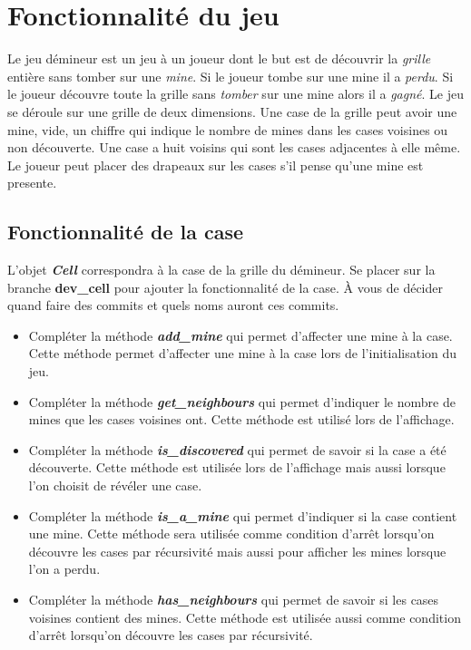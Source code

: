 \section{Fonctionnalité du jeu}
Le jeu démineur est un jeu à un joueur dont le but est de découvrir la \textit{grille} entière sans tomber sur une \textit{mine}. Si le joueur tombe sur une mine il a \textit{perdu}. Si le joueur découvre toute la grille sans \textit{tomber} sur une mine alors il a \textit{gagné}. Le jeu se déroule sur une grille de deux dimensions. Une case de la grille peut avoir une mine, vide, un chiffre qui indique le nombre de mines dans les cases voisines ou non découverte. Une case a huit voisins qui sont les cases adjacentes à elle même. Le joueur peut placer des drapeaux sur les cases s'il pense qu'une mine est presente.

\subsection{Fonctionnalité de la case}
L'objet \textit{\textbf{Cell}} correspondra à la case de la grille du démineur. Se placer sur la branche \textbf{dev\_cell} pour ajouter la fonctionnalité de la case. À vous de décider quand faire des commits et quels noms auront ces commits.

\medskip

\begin{itemize}
    \item Compléter la méthode \textit{\textbf{add\_mine}} qui permet d'affecter une mine à la case. Cette méthode permet d'affecter une mine à la case lors de l'initialisation du jeu.
    \medskip
    \item Compléter la méthode \textit{\textbf{get\_neighbours}} qui permet d'indiquer le nombre de mines que les cases voisines ont. Cette méthode est utilisé lors de l'affichage.
    \medskip
    \item Compléter la méthode \textit{\textbf{is\_discovered}} qui permet de savoir si la case a été découverte. Cette méthode est utilisée lors de l'affichage mais aussi lorsque l'on choisit de révéler une case.
    \medskip
    \item Compléter la méthode \textit{\textbf{is\_a\_mine}} qui permet d'indiquer si la case contient une mine. Cette méthode sera utilisée comme condition d'arrêt lorsqu'on découvre les cases par récursivité mais aussi pour afficher les mines lorsque l'on a perdu.
    \medskip
    \item Compléter la méthode \textit{\textbf{has\_neighbours}} qui permet de savoir si les cases voisines contient des mines. Cette méthode est utilisée aussi comme condition d'arrêt lorsqu'on découvre les cases par récursivité.
\end{itemize}

